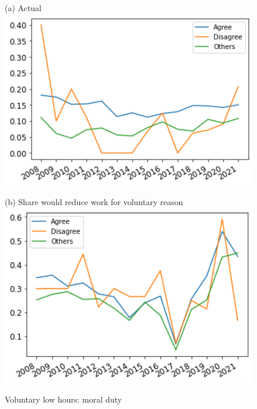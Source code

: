 \documentclass[12pt]{article}
\begin{document}
\begin{figure}[h!!]
	\centering	
	\caption{Voluntary low hours: moral duty }\label{fig:evolution_wtr_moral}	
	\begin{minipage}[h!!]{0.32\textwidth}  
		\centering\footnotesize{(a) Actual}
		\includegraphics[width=1\textwidth]{../codding_data/results/liss/broad_groups_work_redcuctionqk20a183_actual.png}
	\end{minipage}
	\begin{minipage}[h!!]{0.32\textwidth}
		\centering\footnotesize{(b) Share would reduce work for voluntary reason}
		\includegraphics[width=1\textwidth]{../codding_data/results/liss/broad_groups_work_redcuctionqk20a183_willing.png}
	\end{minipage}
\end{figure}
\end{document}
